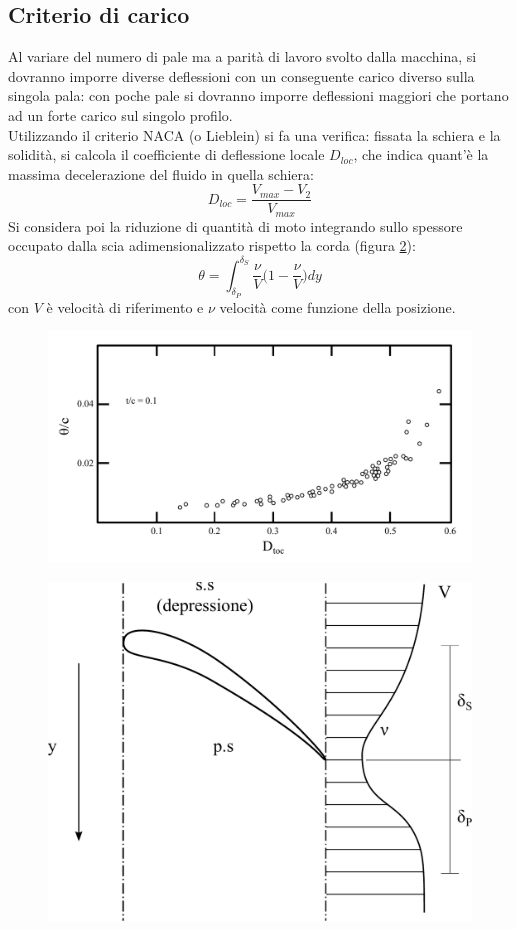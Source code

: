 \subsection{Criterio di carico}
Al variare del numero di pale ma a parità di lavoro svolto dalla macchina, si dovranno imporre diverse deflessioni con un conseguente carico diverso sulla singola pala: con poche pale si dovranno imporre deflessioni maggiori che portano ad un forte carico sul singolo profilo.\\
Utilizzando il criterio NACA (o Lieblein) si fa una verifica: fissata la schiera e la solidità, si calcola il coefficiente di deflessione locale $D_{loc}$, che indica quant'è la massima decelerazione del fluido in quella schiera:
\begin{equation}\label{eq:D_loc}
D_{loc} = \frac{V_{max} - V_2}{V_{max}}
\end{equation}
Si considera poi la riduzione di quantità di moto integrando sullo spessore occupato dalla scia adimensionalizzato rispetto la corda (figura \ref{fig:CritCarico2}):
\begin{equation}\label{eq:D_ridqmot}
\theta = \int_{\delta_P}^{\delta_S} \frac{\nu}{V} \bigg(1- \frac{\nu}{V} \bigg) dy
\end{equation} 
con $V$ è velocità di riferimento e $\nu$ velocità come funzione della posizione.
\begin{figure}
\centering
  \includegraphics[width=\textwidth]{fig/CritCarico1.pdf}
\caption{}
\label{fig:CritCarico1}
\end{figure}
\begin{figure}
\centering
  \includegraphics[width=.4\textwidth]{fig/CritCarico2.pdf}
\caption{}
\label{fig:CritCarico2}
\end{figure}
